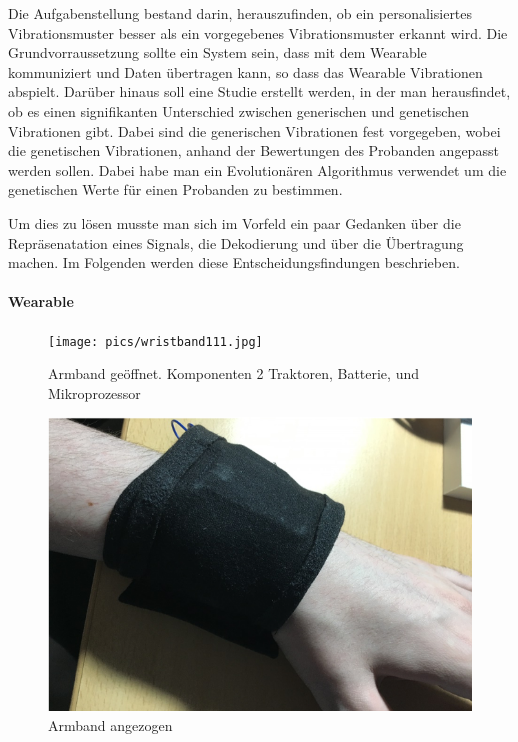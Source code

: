 
Die Aufgabenstellung bestand darin, herauszufinden, ob ein personalisiertes Vibrationsmuster besser als ein vorgegebenes Vibrationsmuster erkannt wird.
Die Grundvorraussetzung sollte ein System sein, dass mit dem Wearable kommuniziert und Daten {\"u}bertragen kann, so dass das Wearable Vibrationen abspielt. 
Dar{\"u}ber hinaus soll eine Studie erstellt werden, in der man herausfindet, ob es einen signifikanten Unterschied zwischen generischen und genetischen Vibrationen gibt. 
Dabei sind die generischen Vibrationen fest vorgegeben, wobei die genetischen Vibrationen, anhand der Bewertungen des Probanden angepasst werden sollen. 
Dabei habe man ein Evolution{\"a}ren Algorithmus verwendet um die genetischen Werte f{\"u}r einen Probanden zu bestimmen. 

Um dies zu l{\"o}sen musste man sich im Vorfeld ein paar Gedanken {\"u}ber die Repr{\"a}senatation eines Signals, die Dekodierung und {\"u}ber die {\"U}bertragung machen.
Im Folgenden werden diese Entscheidungsfindungen beschrieben.

\paragraph{Wearable}

\begin{figure}
	\centering
    \texttt{[image: pics/wristband111.jpg]}
    \caption{Armband ge{\"o}ffnet. Komponenten 2 Traktoren, Batterie, und Mikroprozessor}
    \label{fig:wristband1}
\end{figure}

\begin{figure}
	\centering
    \includegraphics[width=\textwidth]{pics/wristband2.png}
    \caption{Armband angezogen}
    \label{fig:wristband2}
\end{figure}

